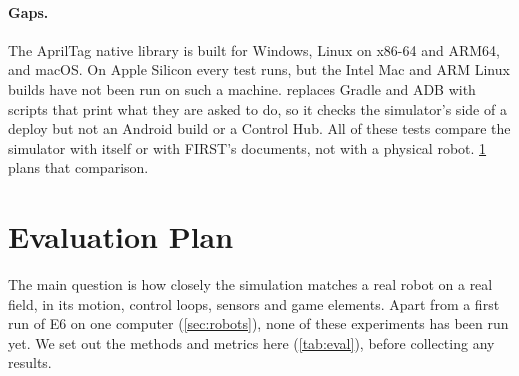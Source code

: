 \documentclass[10pt,twocolumn,letterpaper]{article}
\begin{document}
\paragraph{Gaps.} The AprilTag native library is built for Windows, Linux on x86-64 and ARM64, and macOS. On Apple Silicon every test runs, but the Intel Mac and ARM Linux builds have not been run on such a machine.  replaces Gradle and ADB with scripts that print what they are asked to do, so it checks the simulator's side of a deploy but not an Android build or a Control Hub. All of these tests compare the simulator with itself or with FIRST's documents, not with a physical robot. \cref{sec:evaluation} plans that comparison.

\section{Evaluation Plan}\label{sec:evaluation}

The main question is how closely the simulation matches a real robot on a real field, in its motion, control loops, sensors and game elements. Apart from a first run of E6 on one computer (\cref{sec:robots}), none of these experiments has been run yet. We set out the methods and metrics here (\cref{tab:eval}), before collecting any results.
\end{document}
